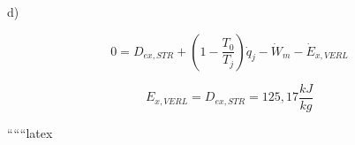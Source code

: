 d)
\]

\[
0 = D_{ex,STR} + \left(1 - \frac{T_0}{T_j}\right) \dot{q}_j - \dot{W}_m - \dot{E}_{x,VERL}
\]

\[
E_{x,VERL} = D_{ex,STR} = 125,17 \frac{kJ}{kg}
\]

``````latex